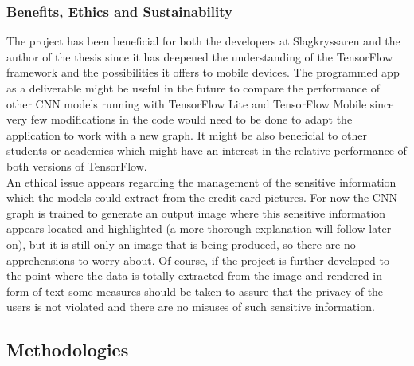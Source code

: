 \subsubsection{Benefits, Ethics and Sustainability} \label{sssec:ethics}
The project has been beneficial for both the developers at Slagkryssaren and the author of the thesis since it has deepened the understanding of the TensorFlow framework and the possibilities it offers to mobile devices. The programmed app as a deliverable might be useful in the future to compare the performance of other CNN models running with TensorFlow Lite and TensorFlow Mobile since very few modifications in the code would need to be done to adapt the application to work with a new graph. It might be also beneficial to other students or academics which might have an interest in the relative performance of both versions of TensorFlow.\\
An ethical issue appears regarding the management of the sensitive information which the models could extract from the credit card pictures. For now the CNN graph is trained to generate an output image where this sensitive information appears located and highlighted (a more thorough explanation will follow later on), but it is still only an image that is being produced, so there are no apprehensions to worry about. Of course, if the project is further developed to the point where the data is totally extracted from the image and rendered in form of text some measures should be taken to assure that the privacy of the users is not violated and there are no misuses of such sensitive information. \\

\subsection{Methodologies}

